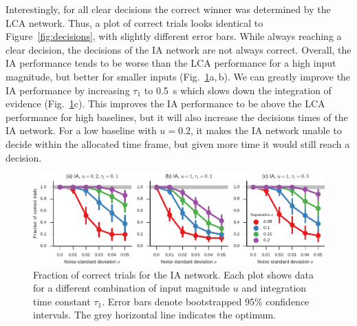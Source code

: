 \documentclass[10pt,letterpaper]{article}
\begin{document}
Interestingly, for all clear decisions the correct winner was determined by the LCA network.
Thus, a plot of correct trials looks identical to Figure~\ref{fig:decisions}, with slightly different error bars.
While always reaching a clear decision, the decisions of the IA network are not always correct.
Overall, the IA performance tends to be worse than the LCA performance for a high input magnitude, but better for smaller inputs (Fig.~\ref{fig:correct}a,\,b).
We can greatly improve the IA performance by increasing $\tau_1$ to \SI{0.5}{\second} which slows down the integration of evidence (Fig.~\ref{fig:correct}c).
This improves the IA performance to be above the LCA performance for high baselines, but it will also increase the decisions times of the IA network.
For a low baseline with $u=0.2$, it makes the IA network unable to decide within the allocated time frame, but given more time it would still reach a decision.
\begin{figure}[t]
    \centering
    \includegraphics{figures/correct}
    \caption{
        Fraction of correct trials for the IA network.
        Each plot shows data for a different combination of input magnitude $u$ and integration time constant $\tau_1$.
        Error bars denote bootstrapped 95\% confidence intervals.
        The grey horizontal line indicates the optimum.
    }\label{fig:correct}
\end{figure}
\end{document}
